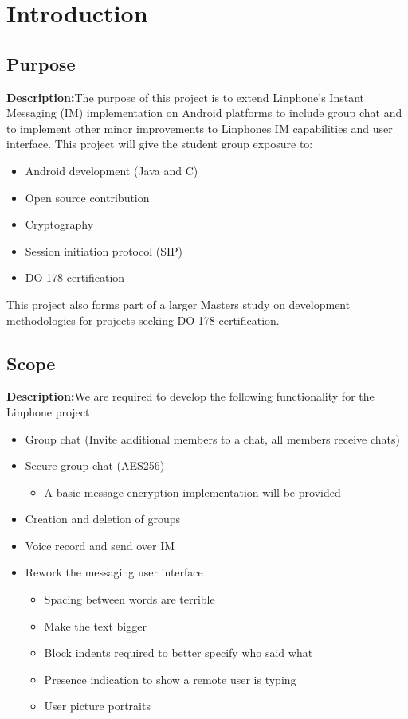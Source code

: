 \documentclass[a4paper]{article}
\begin{document}

\section{Introduction}

\subsection{Purpose}
\textbf{Description:}The purpose of this project is to extend Linphone's Instant Messaging (IM) implementation on Android platforms to include group chat and to implement other minor improvements to Linphones IM capabilities and user interface.
This project will give the student group exposure to:   
 \begin{itemize}
	\item Android development (Java and C)
	\item Open source contribution
	\item Cryptography
	\item Session initiation protocol (SIP)
	\item DO-178 certification
\end{itemize}
This project also forms part of a larger Masters study on development methodologies for projects seeking DO-178 certification.

\subsection{Scope}
\textbf{Description:}We are required to develop the following functionality for the Linphone project   
 \begin{itemize}
	\item Group chat (Invite additional members to a chat, all members receive chats)
	\item Secure group chat (AES256)
		\begin{itemize}
			\item A basic message encryption implementation will be provided
		\end{itemize}		 
	\item Creation and deletion of groups
	\item Voice record and send over IM
	\item Rework the messaging user interface
		\begin{itemize}
			\item Spacing between words are terrible
			\item Make the text bigger
			\item Block indents required to better specify who said what
			\item Presence indication to show a remote user is typing
			\item User picture portraits
		\end{itemize}		
\end{itemize}
\newpage
\end{document}
